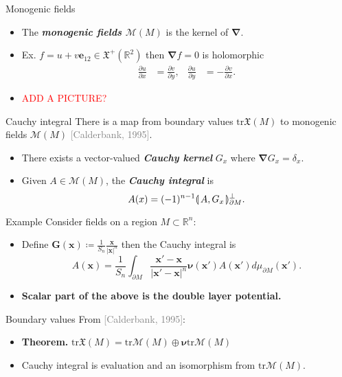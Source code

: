 \documentclass[aspectratio=169]{beamer}
\newcommand\boldgreen[1]{\textcolor{lighter_csu_green}{\emph{\textbf{#1}}}}
\newcommand\boldgold[1]{\textcolor{csu_gold}{\textbf{#1}}}
\newcommand\grey[1]{\textcolor{gray}{#1}}
\newcommand{\directedintproduct}[2]{\llparenthesis \hspace*{.5mm}#1 , #2\hspace*{.5mm} \rrparenthesis}
\newcommand{\trace}{\mathrm{tr}}
\newcommand{\R}{\mathbb{R}}
\newcommand{\grad}{\boldsymbol{\nabla}}
\newcommand{\monogenics}{\mathcal{M}}
\newcommand{\blade}[1]{\boldsymbol{#1}}
\newcommand{\boundary}{{\partial M}}
\newcommand{\normal}{\blade{\nu}}
\newcommand{\smoothfields}{\mathfrak{X}}
\begin{document}
\begin{frame}{Monogenic fields}
\vfill
\begin{itemize}
\pause
\item The \boldgreen{monogenic fields $\monogenics(M)$} is the kernel of $\grad$.
\pause
\item Ex. $f=u+v\blade{e}_{12} \in \smoothfields^+(\R^2)$ then $\grad f = 0$ is holomorphic
\begin{align*}
    \frac{\partial u}{\partial x} &= \frac{\partial v}{\partial y}, &
    \frac{\partial u}{\partial y} &= -\frac{\partial v}{\partial x}.
\end{align*}
\item \textcolor{red}{ADD A PICTURE?}
\pause
\end{itemize}
\vfill
\end{frame}

\begin{frame}{Cauchy integral}
\vfill
There is a map from boundary values $\trace \smoothfields(M)$ to monogenic fields $\monogenics(M)$ \grey{[Calderbank, 1995]}.
\begin{itemize}
\pause
\item There exists a vector-valued \boldgreen{Cauchy kernel} $G_x$ where $\grad G_x = \delta_x$.
\pause
\item Given $A\in \monogenics(M)$, the \boldgreen{Cauchy integral} is
\[
A(x)=(-1)^{n-1}\directedintproduct{A}{G_x}_{\boundary}^\perp.
\]
\end{itemize}
\vfill
\end{frame}

\begin{frame}{Example}
\vfill
Consider fields on a region $M\subset \R^n$:
\begin{itemize}
\pause
\item Define $\blade{G}(\blade{x}) \coloneqq \frac{1}{S_n}\frac{\blade{x}}{|\blade{x}|^n}$ then the Cauchy integral is
\[
A(\blade{x}) = \frac{1}{S_n} \int_\boundary \frac{\blade{x}' - \blade{x}}{|\blade{x}' - \blade{x}|^n}\normal(\blade{x}') A(\blade{x}') d \mu_{\boundary}(\blade{x}').
\]
\pause
\item \boldgold{Scalar part of the above is the double layer potential.}
\end{itemize}
\vfill
\end{frame}

\begin{frame}{Boundary values}
\vfill
From \grey{[Calderbank, 1995]}:
\begin{itemize}
\pause
\item \boldgold{Theorem.} $\trace \smoothfields(M) = \trace \monogenics(M) \oplus \normal \trace \monogenics(M)$
\pause
\item Cauchy integral is evaluation and an isomorphism from $\trace \monogenics(M)$.
\vfill
\end{itemize}
\end{frame}
\end{document}
